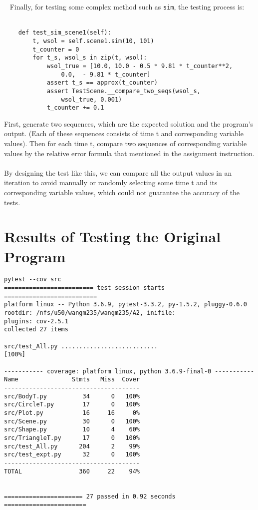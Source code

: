 \documentclass[12pt]{article}
\begin{document}
~\newline\noindent
Finally, for testing some complex method such as \verb|sim|, the testing process is: \\\\
\begin{lstlisting}
    def test_sim_scene1(self):
        t, wsol = self.scene1.sim(10, 101)
        t_counter = 0
        for t_s, wsol_s in zip(t, wsol):
            wsol_true = [10.0, 10.0 - 0.5 * 9.81 * t_counter**2,
                0.0,  - 9.81 * t_counter]
            assert t_s == approx(t_counter)
            assert TestScene.__compare_two_seqs(wsol_s, 
                wsol_true, 0.001)
            t_counter += 0.1
\end{lstlisting}
First, generate two sequences, which are the expected solution and the program's output. (Each of these sequences consists of time t and corresponding variable values). Then for each time t, compare two sequences of corresponding variable values by the relative error formula that mentioned in the assignment instruction.\\\\
By designing the test like this, we can compare all the output values in an iteration to avoid manually or randomly selecting some time t and its corresponding variable values, which could not guarantee the accuracy of the tests.
\section{Results of Testing the Original Program}

\begin{lstlisting}
pytest --cov src
========================= test session starts ==========================
platform linux -- Python 3.6.9, pytest-3.3.2, py-1.5.2, pluggy-0.6.0
rootdir: /nfs/u50/wangm235/wangm235/A2, inifile:
plugins: cov-2.5.1
collected 27 items                                                     

src/test_All.py ...........................                      [100%]

----------- coverage: platform linux, python 3.6.9-final-0 -----------
Name               Stmts   Miss  Cover
--------------------------------------
src/BodyT.py          34      0   100%
src/CircleT.py        17      0   100%
src/Plot.py           16     16     0%
src/Scene.py          30      0   100%
src/Shape.py          10      4    60%
src/TriangleT.py      17      0   100%
src/test_All.py      204      2    99%
src/test_expt.py      32      0   100%
--------------------------------------
TOTAL                360     22    94%


====================== 27 passed in 0.92 seconds =======================
\end{lstlisting}
\end{document}
